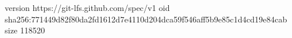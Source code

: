 version https://git-lfs.github.com/spec/v1
oid sha256:771449d82f80da2fd1612d7e4110d204dca59f546aff5b9e85c1d4cd19e84cab
size 118520

